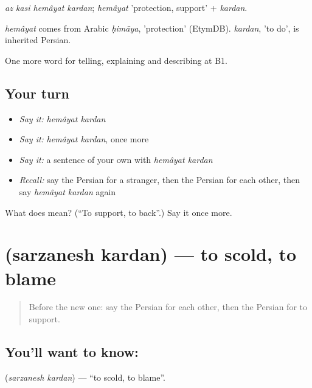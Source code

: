 \emph{az kasi hemâyat kardan}; \emph{hemâyat} 'protection, support' + \emph{kardan}.

\begin{cousinweb}
\emph{hemâyat} comes from Arabic \emph{ḥimāya}, 'protection' (EtymDB). \emph{kardan}, 'to do', is inherited Persian.
\end{cousinweb}

\begin{grammarlens}[title={What you've built}]
One more word for telling, explaining and describing at B1.
\end{grammarlens}

\subsection*{Your turn}
\begin{itemize}
\raggedright
  \item \emph{Say it:} \emph{hemâyat kardan}
  \item \emph{Say it:} \emph{hemâyat kardan}, once more
  \item \emph{Say it:} a sentence of your own with \emph{hemâyat kardan}
  \item \emph{Recall:} say the Persian for a stranger, then the Persian for each other, then say \emph{hemâyat kardan} again
\end{itemize}

\begin{tcolorbox}[breakable,colback=teal!4,colframe=teal!35!black,title={Before you move on}]
What does   mean? (\textquotedblleft{}To support, to back\textquotedblright{}.) Say it once more.
\end{tcolorbox}
\section[\texorpdfstring{\fa{سرزنش} \fa{کردن} (sarzanesh kardan)}{سرزنش کردن (sarzanesh kardan)}]{  (sarzanesh kardan) — to scold, to blame}

\label{lesson:FA-C505-sarzanesh-kardan}



\begin{quote}
Before the new one: say the Persian for each other, then the Persian for to support.
\end{quote}

\subsection*{You'll want to know:  }
\textbf{ } (\emph{sarzanesh kardan}) — \textquotedblleft{}to scold, to blame\textquotedblright{}.

